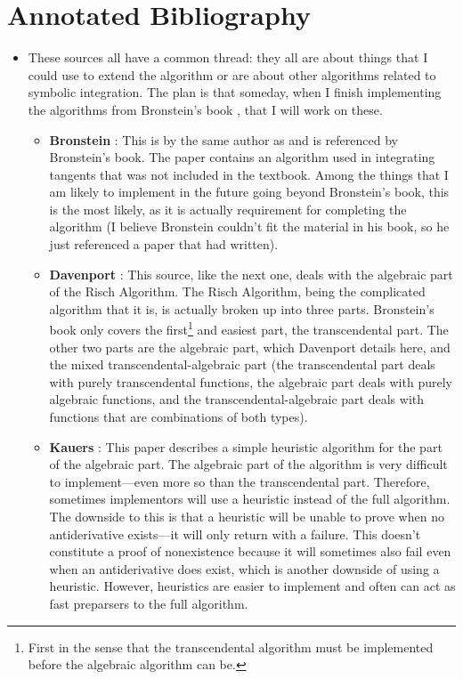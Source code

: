 \documentclass[12pt]{article}
\begin{document}
\appendix
\section{Annotated Bibliography}
\label{annotated-bib}
\begin{itemize}
\item These sources all have a common thread: they all are about things
that I could use to extend the algorithm or are about other algorithms
related to symbolic integration.  The plan is that someday, when I
finish implementing the algorithms from Bronstein's book
\cite{bronstein2005symbolic}, that I will work on these.
    \begin{itemize}
    \item \textbf{Bronstein} \cite{bronstein1989simplification}:  This
    is by the same author as and is referenced by Bronstein's book.  The
    paper contains an algorithm used in integrating tangents that was
    not included in the textbook.  Among the things that I am likely to
    implement in the future going beyond Bronstein's book, this is the
    most likely, as it is actually requirement for completing the
    algorithm (I believe Bronstein couldn't fit the material in his
    book, so he just referenced a paper that had written).

    \item \textbf{Davenport} \cite{davenport1984integration}: This
    source, like the next one, deals with the algebraic part of the
    Risch Algorithm.  The Risch Algorithm, being the complicated
    algorithm that it is, is actually broken up into three parts. 
    Bronstein's book only covers the first\footnote{First in the sense
    that the transcendental algorithm must be implemented before the
    algebraic algorithm can be.} and easiest part, the transcendental
    part.  The other two parts are the algebraic part, which Davenport
    details here, and the mixed transcendental-algebraic part (the
    transcendental part deals with purely transcendental functions, the
    algebraic part deals with purely algebraic functions, and the
    transcendental-algebraic part deals with functions that are
    combinations of both types).

    \item \textbf{Kauers} \cite{kauers2008integration}: This paper
    describes a simple heuristic algorithm for the part of the algebraic
    part.  The algebraic part of the algorithm is very difficult to
    implement---even more so than the transcendental part.  Therefore,
    sometimes implementors will use a heuristic instead of the full
    algorithm.  The downside to this is that a heuristic will be unable
    to prove when no antiderivative exists---it will only return with a
    failure.  This doesn't constitute a proof of nonexistence because it
    will sometimes also fail even when an antiderivative does exist,
    which is another downside of using a heuristic.  However, heuristics
    are easier to implement and often can act as fast preparsers to the
    full algorithm.
    


\end{itemize}
\end{itemize}
\end{document}
